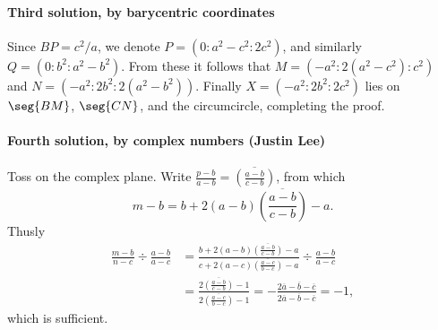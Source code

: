 \paragraph{Third solution, by barycentric coordinates}     Since $BP=c^2/a$, we denote $P=(0:a^2-c^2:2c^2)$, and similarly $Q=(0:b^2:a^2-b^2)$. From these it follows that $M=\left(-a^2:2(a^2-c^2):c^2\right)$ and $N=\left(-a^2:2b^2:2(a^2-b^2)\right)$. Finally $X=(-a^2:2b^2:2c^2)$ lies on $\seg{BM}$, $\seg{CN}$, and the circumcircle, completing the proof.

\paragraph{Fourth solution, by complex numbers (Justin Lee)}     Toss on the complex plane. Write $\tfrac{p-b}{a-b}=\overline{(\tfrac{a-b}{c-b})}$, from which\[m-b=b+2(a-b)\overline{\left(\frac{a-b}{c-b}\right)}-a.\]Thusly
\begin{align*}
    \frac{m-b}{n-c}\div\frac{a-b}{a-c}&=\frac{b+2(a-b)\overline{(\frac{a-b}{c-b})}-a}{c+2(a-c)\overline{(\frac{a-c}{b-c})}-a}\div\frac{a-b}{a-c}\\
    &=\frac{2\overline{(\frac{a-b}{c-b})}-1}{2\overline{(\frac{a-c}{b-c})}-1}=-\frac{2\overline a-\overline b-\overline c}{2\overline a-\overline b-\overline c}=-1,
\end{align*}
which is sufficient.

